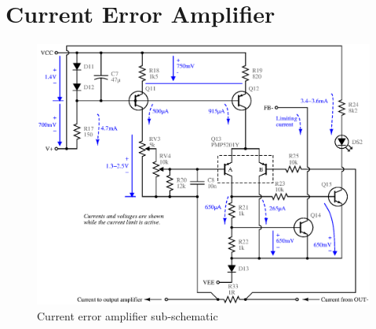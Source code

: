 \section{Current Error Amplifier}

\begin{figure}[H]
\centering
\includegraphics[width=5.5in]{sch/ierror}
\caption{Current error amplifier sub-schematic}
\label{fig:ierror}
\end{figure}

